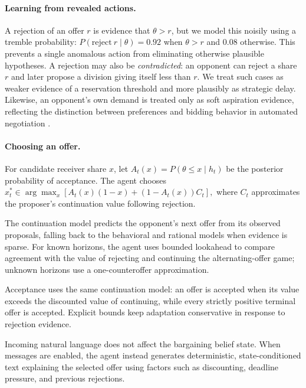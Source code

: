 \documentclass{article}
\begin{document}
\paragraph{Learning from revealed actions.}
A rejection of an offer $r$ is evidence that $\theta>r$, but we model this noisily using a tremble probability: $P(\mathrm{reject}\ r\mid\theta)=0.92$ when $\theta>r$ and $0.08$ otherwise.
This prevents a single anomalous action from eliminating otherwise plausible hypotheses.
A rejection may also be \emph{contradicted}: an opponent can reject a share $r$ and later propose a division giving itself less than $r$.
We treat such cases as weaker evidence of a reservation threshold and more plausibly as strategic delay.
Likewise, an opponent's own demand is treated only as soft aspiration evidence, reflecting the distinction between preferences and bidding behavior in automated negotiation \citep{baarslag2016learning}.


\paragraph{Choosing an offer.}

For candidate receiver share $x$, let
\(
    A_t(x)=P(\theta\leq x\mid h_t)
\)
be the posterior probability of acceptance.
The agent chooses
\(
    x_t^*
      \in
      \arg\max_x
      \left[
        A_t(x)(1-x)
        +(1-A_t(x))C_t
      \right],
    \label{eq:bargaining-choice}
\)
where $C_t$ approximates the proposer's continuation value following rejection.

The continuation model predicts the opponent's next offer from its observed proposals, falling back to the behavioral and rational models when evidence is sparse.
For known horizons, the agent uses bounded lookahead to compare agreement with the value of rejecting and continuing the alternating-offer game; unknown horizons use a one-counteroffer approximation.

Acceptance uses the same continuation model: an offer is accepted when its value exceeds the discounted value of continuing, while every strictly positive terminal offer is accepted.
Explicit bounds keep adaptation conservative in response to rejection evidence.

Incoming natural language does not affect the bargaining belief state.
When messages are enabled, the agent instead generates deterministic, state-conditioned text explaining the selected offer using factors such as discounting, deadline pressure, and previous rejections.
\end{document}
